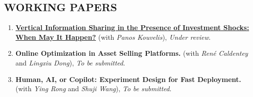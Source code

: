 \documentclass[margin]{res} %
\begin{document}
\begin{resume}
    \section{WORKING PAPERS}
    \begin{enumerate}[resume,leftmargin=*]
        \item \href{https://papers.ssrn.com/sol3/papers.cfm?abstract_id=3936170}{\textbf{Vertical Information Sharing in the Presence of Investment Shocks: When May It Happen?}} (with {\it Panos Kouvelis}), \textit{Under review}.
        \item \textbf{Online Optimization in Asset Selling Platforms.} (with {\it Ren\'{e} Caldentey} and {\it Lingxiu Dong}), \textit{To be submitted}.
        \item \textbf{Human, AI, or Copilot: Experiment Design for Fast Deployment.} (with {\it Ying Rong} and {\it Shuji Wang}), \textit{To be submitted}.
    \end{enumerate}







\end{resume}
\end{document}
